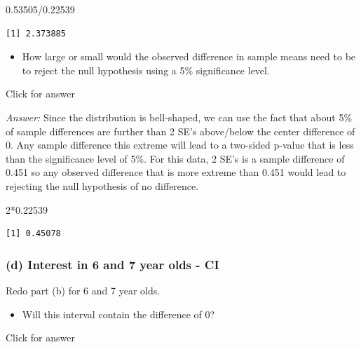\documentclass[
]{book}
\newenvironment{Shaded}{\begin{snugshade}}{\end{snugshade}}
\newcommand{\DecValTok}[1]{\textcolor[rgb]{0.00,0.00,0.81}{#1}}
\newcommand{\FloatTok}[1]{\textcolor[rgb]{0.00,0.00,0.81}{#1}}
\newcommand{\SpecialCharTok}[1]{\textcolor[rgb]{0.00,0.00,0.00}{#1}}
\providecommand{\tightlist}{%
  \setlength{\itemsep}{0pt}\setlength{\parskip}{0pt}}
\begin{document}
\begin{Shaded}
\begin{Highlighting}[]
\FloatTok{0.53505}\SpecialCharTok{/}\FloatTok{0.22539} 
\end{Highlighting}
\end{Shaded}

\begin{verbatim}
[1] 2.373885
\end{verbatim}

\begin{itemize}
\tightlist
\item
  How large or small would the observed difference in sample means need to be to reject the null hypothesis using a 5\% significance level.
\end{itemize}

Click for answer

\emph{Answer:} Since the distribution is bell-shaped, we can use the fact that about 5\% of sample differences are further than 2 SE's above/below the center difference of 0. Any sample difference this extreme will lead to a two-sided p-value that is less than the significance level of 5\%. For this data, 2 SE's is a sample difference of 0.451 so any observed difference that is more extreme than 0.451 would lead to rejecting the null hypothesis of no difference.

\begin{Shaded}
\begin{Highlighting}[]
\DecValTok{2}\SpecialCharTok{*}\FloatTok{0.22539} 
\end{Highlighting}
\end{Shaded}

\begin{verbatim}
[1] 0.45078
\end{verbatim}

\hypertarget{d-interest-in-6-and-7-year-olds---ci}{%
\subsubsection{(d) Interest in 6 and 7 year olds - CI}\label{d-interest-in-6-and-7-year-olds---ci}}

Redo part (b) for 6 and 7 year olds.

\begin{itemize}
\tightlist
\item
  Will this interval contain the difference of 0?
\end{itemize}

Click for answer
\end{document}
